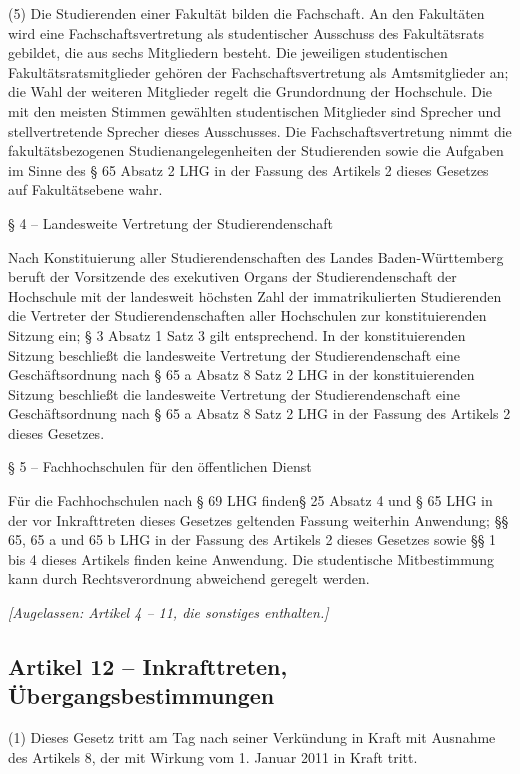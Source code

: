 \documentclass[
10pt,
a4paper,
twoside,								%
titlepage=false,							%
draft=false								%
]{scrartcl}
\begin{document}
(5) Die Studierenden einer Fakultät bilden die Fachschaft. An den Fakultäten wird eine Fachschaftsvertretung als studentischer Ausschuss des Fakultätsrats gebildet, die aus sechs Mitgliedern besteht. Die jeweiligen studentischen Fakultätsratsmitglieder gehören der Fachschaftsvertretung als Amtsmitglieder an; die Wahl der weiteren Mitglieder regelt die Grundordnung der Hochschule. Die mit den meisten Stimmen gewählten studentischen Mitglieder sind Sprecher und stellvertretende Sprecher dieses Ausschusses. Die Fachschaftsvertretung nimmt die fakultätsbezogenen Studienangelegenheiten der Studierenden sowie die Aufgaben im Sinne des § 65 Absatz 2 LHG in der Fassung des Artikels 2 dieses Gesetzes auf Fakultätsebene wahr.


§ 4 – Landesweite Vertretung der Studierendenschaft

Nach Konstituierung aller Studierendenschaften des Landes Baden-Württemberg beruft der Vorsitzende des exekutiven Organs der Studierendenschaft der Hochschule mit der landesweit höchsten Zahl der immatrikulierten Studierenden die Vertreter der Studierendenschaften aller Hochschulen zur konstituierenden Sitzung ein; § 3  Absatz 1 Satz 3 gilt entsprechend. In der konstituierenden Sitzung beschließt die landesweite Vertretung der Studierendenschaft eine Geschäftsordnung nach § 65 a Absatz 8 Satz 2 LHG in der konstituierenden Sitzung beschließt die landesweite Vertretung der Studierendenschaft eine Geschäftsordnung nach § 65 a Absatz 8 Satz 2 LHG in der Fassung des Artikels 2 dieses Gesetzes.


§ 5 – Fachhochschulen für den öffentlichen Dienst

Für die Fachhochschulen nach § 69 LHG finden§ 25 Absatz 4 und § 65 LHG in der vor Inkrafttreten dieses Gesetzes geltenden Fassung weiterhin Anwendung; §§ 65, 65 a und 65 b LHG in der Fassung des Artikels 2 dieses Gesetzes sowie §§ 1 bis 4 dieses Artikels finden keine Anwendung. Die studentische Mitbestimmung kann durch Rechtsverordnung abweichend geregelt werden.




\emph{[Augelassen: Artikel 4 – 11, die sonstiges enthalten.]}


\subsection{Artikel 12 – Inkrafttreten, Übergangsbestimmungen}

(1) Dieses Gesetz tritt am Tag nach seiner Verkündung in Kraft mit Ausnahme des Artikels 8, der mit Wirkung vom 1. Januar 2011 in Kraft tritt.
\end{document}
